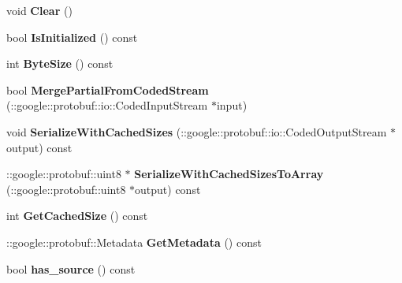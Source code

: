 \begin{DoxyCompactItemize}
void {\bfseries Clear} ()
\item 
\mbox{\label{classcaffe_1_1_infogain_loss_parameter_ad31c2430a9dfa2213fadf65c76c067b4}} 
bool {\bfseries Is\+Initialized} () const
\item 
\mbox{\label{classcaffe_1_1_infogain_loss_parameter_a8a4a36a11ce7e32617e71316c2aa73d3}} 
int {\bfseries Byte\+Size} () const
\item 
\mbox{\label{classcaffe_1_1_infogain_loss_parameter_a4abddd5b02e4b8540346f79724f63b74}} 
bool {\bfseries Merge\+Partial\+From\+Coded\+Stream} (\+::google\+::protobuf\+::io\+::\+Coded\+Input\+Stream $\ast$input)
\item 
\mbox{\label{classcaffe_1_1_infogain_loss_parameter_aeee8ddb424dff7ff8a24fe8a2800ab05}} 
void {\bfseries Serialize\+With\+Cached\+Sizes} (\+::google\+::protobuf\+::io\+::\+Coded\+Output\+Stream $\ast$output) const
\item 
\mbox{\label{classcaffe_1_1_infogain_loss_parameter_ae5356466517de10b5bcb3a52aae3b131}} 
\+::google\+::protobuf\+::uint8 $\ast$ {\bfseries Serialize\+With\+Cached\+Sizes\+To\+Array} (\+::google\+::protobuf\+::uint8 $\ast$output) const
\item 
\mbox{\label{classcaffe_1_1_infogain_loss_parameter_ab0760aaeb3839bbedf3fc12737f3f552}} 
int {\bfseries Get\+Cached\+Size} () const
\item 
\mbox{\label{classcaffe_1_1_infogain_loss_parameter_a3079b63cb1bf0548f8f52f28224fd796}} 
\+::google\+::protobuf\+::\+Metadata {\bfseries Get\+Metadata} () const
\item 
\mbox{\label{classcaffe_1_1_infogain_loss_parameter_ab3a812eaa1f25e7c34e2365e52a3c388}} 
bool {\bfseries has\+\_\+source} () const
\item 
\mbox{\label{classcaffe_1_1_infogain_loss_parameter_a747609288c3bded3469dcef8e122c1d6}} 

\end{DoxyCompactItemize}
